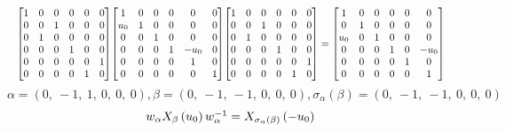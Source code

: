\documentclass[11pt]{article}
\theoremstyle{definition}
\begin{document}
\[
\scaletoalign{\textwidth}{{\left[\begin{matrix}1 & 0 & 0 & 0 & 0 & 0\\0 & 0 & 1 & 0 & 0 & 0\\0 & 1 & 0 & 0 & 0 & 0\\0 & 0 & 0 & 1 & 0 & 0\\0 & 0 & 0 & 0 & 0 & 1\\0 & 0 & 0 & 0 & 1 & 0\end{matrix}\right]} {\left[\begin{matrix}1 & 0 & 0 & 0 & 0 & 0\\u_{0} & 1 & 0 & 0 & 0 & 0\\0 & 0 & 1 & 0 & 0 & 0\\0 & 0 & 0 & 1 & - u_{0} & 0\\0 & 0 & 0 & 0 & 1 & 0\\0 & 0 & 0 & 0 & 0 & 1\end{matrix}\right]} {\left[\begin{matrix}1 & 0 & 0 & 0 & 0 & 0\\0 & 0 & 1 & 0 & 0 & 0\\0 & 1 & 0 & 0 & 0 & 0\\0 & 0 & 0 & 1 & 0 & 0\\0 & 0 & 0 & 0 & 0 & 1\\0 & 0 & 0 & 0 & 1 & 0\end{matrix}\right]} = {\left[\begin{matrix}1 & 0 & 0 & 0 & 0 & 0\\0 & 1 & 0 & 0 & 0 & 0\\u_{0} & 0 & 1 & 0 & 0 & 0\\0 & 0 & 0 & 1 & 0 & - u_{0}\\0 & 0 & 0 & 0 & 1 & 0\\0 & 0 & 0 & 0 & 0 & 1\end{matrix}\right]}}
\]
\[
\alpha = \left( 0, \  -1, \  1, \  0, \  0, \  0\right), \beta = \left( 0, \  -1, \  -1, \  0, \  0, \  0\right), \sigma_{\alpha}(\beta) = \left( 0, \  -1, \  -1, \  0, \  0, \  0\right)
\]
\[
\scaletoalign{\textwidth}{w_{\alpha} X_{\beta}\left(u_{0}\right) w_{\alpha}^{-1} = X_{\sigma_{\alpha}\left(\beta\right)}\left(- u_{0}\right)}
\]
\end{document}
